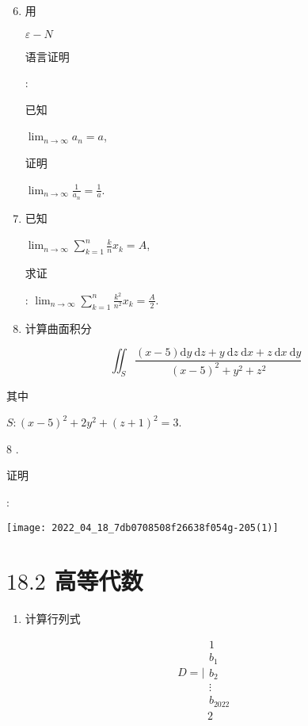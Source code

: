 \documentclass[10pt]{article}
\begin{document}
\begin{enumerate}
  \setcounter{enumi}{5}
  \item \begin{CJK}{UTF8}{mj}用\end{CJK} $\varepsilon-N$ \begin{CJK}{UTF8}{mj}语言证明\end{CJK}: \begin{CJK}{UTF8}{mj}已知\end{CJK} $\lim _{n \rightarrow \infty} a_{n}=a$, \begin{CJK}{UTF8}{mj}证明\end{CJK} $\lim _{n \rightarrow \infty} \frac{1}{a_{n}}=\frac{1}{a}$.

  \item \begin{CJK}{UTF8}{mj}已知\end{CJK} $\lim _{n \rightarrow \infty} \sum_{k=1}^{n} \frac{k}{n} x_{k}=A$, \begin{CJK}{UTF8}{mj}求证\end{CJK}: $\lim _{n \rightarrow \infty} \sum_{k=1}^{n} \frac{k^{2}}{n^{2}} x_{k}=\frac{A}{2}$.

  \item \begin{CJK}{UTF8}{mj}计算曲面积分\end{CJK}

\end{enumerate}
$$
\iint_{S} \frac{(x-5) \mathrm{d} y \mathrm{~d} z+y \mathrm{~d} z \mathrm{~d} x+z \mathrm{~d} x \mathrm{~d} y}{(x-5)^{2}+y^{2}+z^{2}}
$$
\begin{CJK}{UTF8}{mj}其中\end{CJK} $S:(x-5)^{2}+2 y^{2}+(z+1)^{2}=3$.

8 . \begin{CJK}{UTF8}{mj}证明\end{CJK}:

\texttt{[image: 2022\_04\_18\_7db0708508f26638f054g-205(1)]}

\section{$18.2$ 高等代数}
\begin{enumerate}
  \item \begin{CJK}{UTF8}{mj}计算行列式\end{CJK}
\end{enumerate}
$$
D=\mid \begin{gathered}
1 \\
b_{1} \\
b_{2} \\
\vdots \\
b_{2022}
\end{gathered}
$$
$$
\begin{aligned}
& 2
\end{aligned}
$$
\end{document}
